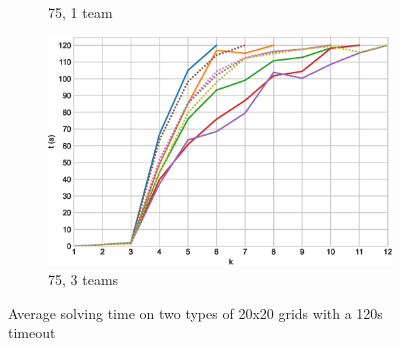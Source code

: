 \documentclass[english,10pt]{article}
\begin{document}
\begin{figure}[b]
\begin{subfigure}{0.44\textwidth}
			\caption{75, 1 team}
			\label{fig:75-1}
		\end{subfigure}
		\begin{subfigure}{0.44\textwidth}
			\centering
			\includegraphics[width=\linewidth]{img/results/icts-comparison/75-3}
			\caption{75, 3 teams}
			\label{fig:75-3}
		\end{subfigure}
		\caption{Average solving time on two types of 20x20 grids with a 120s timeout}
		\label{fig:times}
	\end{figure}
\end{document}
